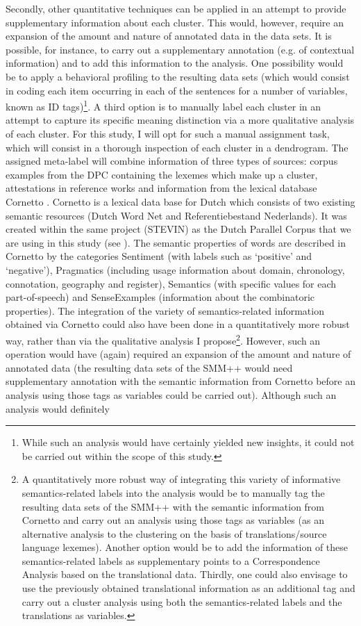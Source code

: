 Secondly, other quantitative techniques can be applied in an attempt to provide supplementary information about each cluster. This would, however, require an expansion of the amount and nature of annotated data in the data sets. It is possible, for instance, to carry out a supplementary annotation (e.g. of contextual information) and to add this information to the analysis. One possibility would be to apply a behavioral profiling \citep{divjak_ways_2006, divjak_clusters_2008, evans_behavioral_2009} to the resulting data sets (which would consist in coding each item occurring in each of the sentences for a number of variables, known as ID tags)\footnote{While such an analysis would have certainly yielded new insights, it could not be carried out within the scope of this study.}. A third option is to manually label each cluster in an attempt to capture its specific meaning distinction via a more qualitative analysis of each cluster. For this study, I will opt for such a manual assignment task, which will consist in a thorough inspection of each cluster in a dendrogram. The assigned meta-label will combine information of three types of sources: corpus examples from the DPC containing the lexemes which make up a cluster, attestations in reference works and information from the lexical database Cornetto \citep{vossen_cornetto_2008, spyns_cornetto:_2013}. Cornetto is a lexical data base for Dutch which consists of two existing semantic resources (Dutch Word Net and Referentiebestand Nederlands). It was created within the same project (STEVIN) as the Dutch Parallel Corpus that we are using in this study (see ). The semantic properties of words are described in Cornetto by the categories Sentiment (with labels such as ‘positive’ and ‘negative’), Pragmatics (including usage information about domain, chronology, connotation, geography and register), Semantics (with specific values for each part-of-speech) and SenseExamples (information about the combinatoric properties). The integration of the variety of semantics-related information obtained via Cornetto could also have been done in a quantitatively more robust way, rather than via the qualitative analysis I propose\footnote{A quantitatively more robust way of integrating this variety of informative semantics-related labels into the analysis would be to manually tag the resulting data sets of the SMM++ with the semantic information from Cornetto and carry out an analysis using those tags as variables (as an alternative analysis to the clustering on the basis of translations/source language lexemes). Another option would be to add the information of these semantics-related labels as supplementary points to a Correspondence Analysis based on the translational data. Thirdly, one could also envisage to use the previously obtained translational information as an additional tag and carry out a cluster analysis using both the semantics-related labels and the translations as variables.}. However, such an operation would have (again) required an expansion of the amount and nature of annotated data (the resulting data sets of the SMM++ would need supplementary annotation with the semantic information from Cornetto before an analysis using those tags as variables could be carried out). Although such an analysis would definitely 